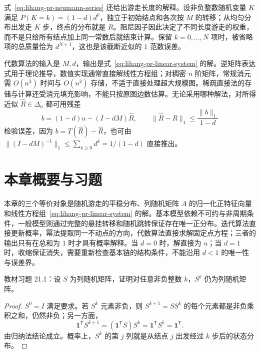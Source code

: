 式~\eqref{eq:lihang-pr-neumann-series} 还给出游走长度的解释。设非负整数随机变量 $K$ 满足 $P(K=k)=(1-d)d^k$，独立于初始结点和各次按 $M$ 的转移；从均匀分布出发走 $K$ 步，终点的分布就是 $R$。阻尼因子因此决定了不同长度游走的权重，而不是只给所有结点加上同一常数后就结束计算。保留 $k=0,\ldots,N$ 项时，被省略项的总质量恰为 $d^{N+1}$，这也是该截断近似的 $1$ 范数误差。

代数算法的输入是 $M,d$，输出是式~\eqref{eq:lihang-pr-linear-system} 的解。逆矩阵表达式用于理论推导，数值实现通常直接解线性方程组；对稠密 $n$ 阶矩阵，常规消元需 $O(n^3)$ 时间与 $O(n^2)$ 存储，不适于直接处理超大规模图。稀疏直接法的存储与计算还受消元填充影响，不能只按原图边数估算。无论采用哪种解法，对所得近似 $\widehat R\in\Delta_n$ 都可用残差
\begin{equation}
\label{eq:lihang-pr-linear-residual}
    b=(1-d)u-(I-dM)\widehat R,\qquad
    \|\widehat R-R\|_1\leq\frac{\|b\|_1}{1-d}
\end{equation}
检验误差，因为 $b=T(\widehat R)-\widehat R$，也可由 $\|(I-dM)^{-1}\|_1\leq\sum_{k\geq0}d^k=1/(1-d)$ 直接推出。

\section{本章概要与习题}
\label{sec:lihang-pr-summary-exercises}

本章的三个等价对象是随机游走的平稳分布、列随机矩阵 $A$ 的归一化正特征向量和线性方程组~\eqref{eq:lihang-pr-linear-system} 的解。基本模型依赖不可约与非周期条件，一般模型则通过完整的悬挂转移和随机跳转保证存在唯一正分布。迭代算法直接更新概率，幂法提取同一不动点的方向，代数算法直接求解固定点方程；三者的输出只有在总和为 $1$ 时才具有概率解释。当 $d=0$ 时，解直接为 $u$；当 $d=1$ 时，收缩保证消失，需要重新检查基本链的结构条件，不能沿用 $d<1$ 的唯一性与误差界。

\begin{example}
\label{ex:lihang-pr-exercise-powers}
教材习题 21.1：设 $S$ 为列随机矩阵，证明对任意非负整数 $k$，$S^k$ 仍为列随机矩阵。
\end{example}

\begin{proof}
$S^0=I$ 满足要求。若 $S^k$ 元素非负，则 $S^{k+1}=SS^k$ 的每个元素都是非负乘积之和，仍然非负；另一方面，
\[
    \boldsymbol1^{\mathsf T}S^{k+1}
    =(\boldsymbol1^{\mathsf T}S)S^k
    =\boldsymbol1^{\mathsf T}S^k
    =\boldsymbol1^{\mathsf T}.
\]
由归纳法结论成立。概率上，$S^k$ 的第 $j$ 列就是从结点 $j$ 出发经过 $k$ 步后的状态分布。
\end{proof}

